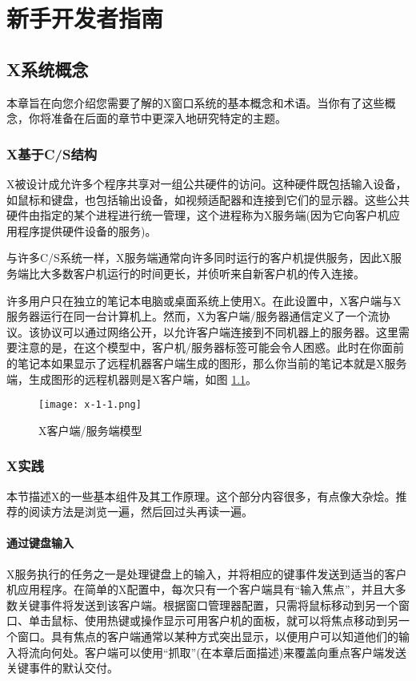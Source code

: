 \chapter{新手开发者指南}

\section{X系统概念}

本章旨在向您介绍您需要了解的X窗口系统的基本概念和术语。当你有了这些概念，你将准备在后面的章节中更深入地研究特定的主题。

\subsection{X基于C/S结构}

X被设计成允许多个程序共享对一组公共硬件的访问。这种硬件既包括输入设备，如鼠标和键盘，也包括输出设备，如视频适配器和连接到它们的显示器。这些公共硬件由指定的某个进程进行统一管理，这个进程称为X服务端(因为它向客户机应用程序提供硬件设备的服务)。


与许多C/S系统一样，X服务端通常向许多同时运行的客户机提供服务，因此X服务端比大多数客户机运行的时间更长，并侦听来自新客户机的传入连接。


许多用户只在独立的笔记本电脑或桌面系统上使用X。在此设置中，X客户端与X服务器运行在同一台计算机上。然而，X为客户端/服务器通信定义了一个流协议。该协议可以通过网络公开，以允许客户端连接到不同机器上的服务器。这里需要注意的是，在这个模型中，客户机/服务器标签可能会令人困惑。此时在你面前的笔记本如果显示了远程机器客户端生成的图形，那么你当前的笔记本就是X服务端，生成图形的远程机器则是X客户端，如图 \ref{img-1.1.1-1}。


\begin{figure}[h]
    \centering
    \texttt{[image: x-1-1.png]}
    \caption{X客户端/服务端模型}
    \label{img-1.1.1-1}
\end{figure}

\subsection{X实践}

本节描述X的一些基本组件及其工作原理。这个部分内容很多，有点像大杂烩。推荐的阅读方法是浏览一遍，然后回过头再读一遍。

\subsubsection{通过键盘输入}

X服务执行的任务之一是处理键盘上的输入，并将相应的键事件发送到适当的客户机应用程序。在简单的X配置中，每次只有一个客户端具有“输入焦点”，并且大多数关键事件将发送到该客户端。根据窗口管理器配置，只需将鼠标移动到另一个窗口、单击鼠标、使用热键或操作显示可用客户机的面板，就可以将焦点移动到另一个窗口。具有焦点的客户端通常以某种方式突出显示，以便用户可以知道他们的输入将流向何处。客户端可以使用“抓取”(在本章后面描述)来覆盖向重点客户端发送关键事件的默认交付。

